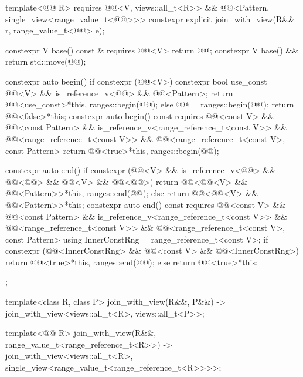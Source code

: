 \begin{codeblock}
{{    template<@@ R>
      requires @@<V, views::all_t<R>> &&
               @@<Pattern, single_view<range_value_t<@@>>>
    constexpr explicit join_with_view(R&& r, range_value_t<@@> e);

    constexpr V base() const & requires @@<V> { return @@; }
    constexpr V base() && { return std::move(@@); }

    constexpr auto begin() {
      if constexpr (@@<V>) {
        constexpr bool use_const =
          @@<V> && is_reference_v<@@> && @@<Pattern>;
        return @@<use_const>{*this, ranges::begin(@@)};
      }
      else {
        @@ = ranges::begin(@@);
        return @@<false>{*this};
      }
    }
    constexpr auto begin() const
      requires @@<const V> &&
               @@<const Pattern> &&
               is_reference_v<range_reference_t<const V>> &&
               @@<range_reference_t<const V>> &&
               @@<range_reference_t<const V>, const Pattern> {
      return @@<true>{*this, ranges::begin(@@)};
    }

    constexpr auto end() {
      if constexpr (@@<V> &&
                    is_reference_v<@@> && @@<@@> &&
                    @@<V> && @@<@@>)
        return @@<@@<V> && @@<Pattern>>{*this, ranges::end(@@)};
      else
        return @@<@@<V> && @@<Pattern>>{*this};
    }
    constexpr auto end() const
      requires @@<const V> && @@<const Pattern> &&
               is_reference_v<range_reference_t<const V>> &&
               @@<range_reference_t<const V>> &&
               @@<range_reference_t<const V>, const Pattern> {
      using InnerConstRng = range_reference_t<const V>;
      if constexpr (@@<InnerConstRng> &&
                    @@<const V> && @@<InnerConstRng>)
        return @@<true>{*this, ranges::end(@@)};
      else
        return @@<true>{*this};
    }
  };

  template<class R, class P>
    join_with_view(R&&, P&&) -> join_with_view<views::all_t<R>, views::all_t<P>>;

  template<@@ R>
    join_with_view(R&&, range_value_t<range_reference_t<R>>)
      -> join_with_view<views::all_t<R>, single_view<range_value_t<range_reference_t<R>>>>;
}
\end{codeblock}

